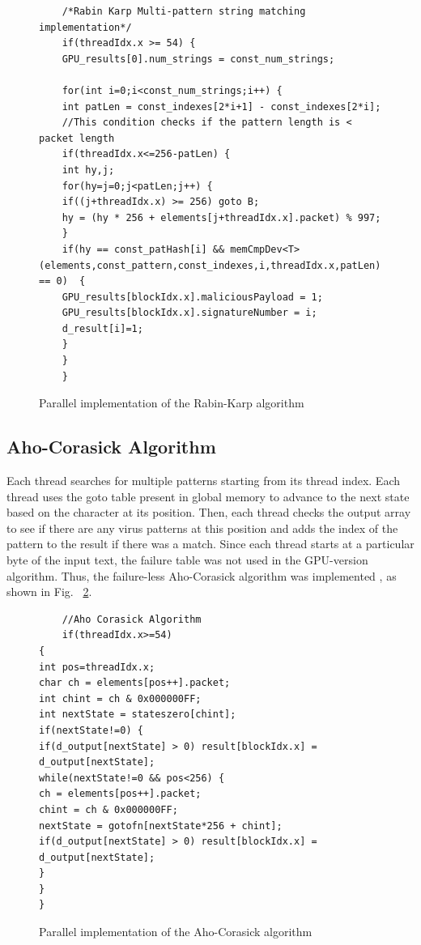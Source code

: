 \begin{figure}[H]
	\begin{lstlisting}
	/*Rabin Karp Multi-pattern string matching implementation*/
	if(threadIdx.x >= 54) {
	GPU_results[0].num_strings = const_num_strings;
	
	for(int i=0;i<const_num_strings;i++) {
	int patLen = const_indexes[2*i+1] - const_indexes[2*i];
	//This condition checks if the pattern length is < packet length
	if(threadIdx.x<=256-patLen) {
	int hy,j;
	for(hy=j=0;j<patLen;j++) {
	if((j+threadIdx.x) >= 256) goto B;
	hy = (hy * 256 + elements[j+threadIdx.x].packet) % 997;
	}
	if(hy == const_patHash[i] && memCmpDev<T>(elements,const_pattern,const_indexes,i,threadIdx.x,patLen) == 0)  {
	GPU_results[blockIdx.x].maliciousPayload = 1;
	GPU_results[blockIdx.x].signatureNumber = i; 
	d_result[i]=1;
	} 
	}
	}		
	\end{lstlisting}
	\caption{Parallel implementation of the Rabin-Karp algorithm}
	\label{fig:multi rabin-karp}
\end{figure}
\squeezeup

\subsection{Aho-Corasick Algorithm}
Each thread searches for multiple patterns starting from its thread index. Each thread uses the goto table present in global memory to advance to the next state based on the character at its position. Then, each thread checks the output array to see if there are any virus patterns at this position and adds the index of the pattern to the result if there was a match. Since each thread starts at a particular byte of the input text, the failure table was not used in the GPU-version algorithm. Thus, the failure-less Aho-Corasick algorithm was implemented \cite{bib20}, as shown in Fig. ~\ref{fig:multi aho-cor}.

\begin{figure}[H]
	\begin{lstlisting}
	//Aho Corasick Algorithm
	if(threadIdx.x>=54)
{
int pos=threadIdx.x;
char ch = elements[pos++].packet;
int chint = ch & 0x000000FF; 
int nextState = stateszero[chint];
if(nextState!=0) {
if(d_output[nextState] > 0) result[blockIdx.x] = d_output[nextState];
while(nextState!=0 && pos<256) {
ch = elements[pos++].packet;
chint = ch & 0x000000FF;
nextState = gotofn[nextState*256 + chint];
if(d_output[nextState] > 0) result[blockIdx.x] = d_output[nextState];
}
}
}
	\end{lstlisting}
	\caption{Parallel implementation of the Aho-Corasick algorithm}
	\label{fig:multi aho-cor}
\end{figure}
\squeezeup

